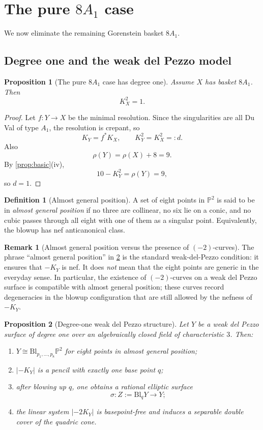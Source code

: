 \documentclass[11pt]{article}
\newtheorem{proposition}[proposition]{Proposition}
\theoremstyle{definition}
\newtheorem{remark}[remark]{Remark}
\newtheorem{definition}[definition]{Definition}
\newcommand{\Pbb}{\mathbb P}
\newcommand{\Bl}{\mathrm{Bl}}
\begin{document}
\section{The pure $8A_1$ case}\label{sec:pure8a1}
We now eliminate the remaining Gorenstein basket $8A_1$.

\subsection{Degree one and the weak del Pezzo model}

\begin{proposition}[The pure $8A_1$ case has degree one]\label{prop:8a1-degree-one}
Assume $X$ has basket $8A_1$. Then
\[
K_X^2=1.
\]
\end{proposition}

\begin{proof}
Let $f\colon Y\to X$ be the minimal resolution. Since the singularities are all Du Val of type $A_1$, the resolution is crepant, so
\[
K_Y=f^*K_X,
\qquad
K_Y^2=K_X^2=:d.
\]
Also
\[
\rho(Y)=\rho(X)+8=9.
\]
By \cref{prop:basic}(iv),
\[
10-K_Y^2=\rho(Y)=9,
\]
so $d=1$.
\end{proof}

\begin{definition}[Almost general position]
A set of eight points in $\Pbb^2$ is said to be in \emph{almost general position} if no three are collinear, no six lie on a conic, and no cubic passes through all eight with one of them as a singular point. Equivalently, the blowup has nef anticanonical class.
\end{definition}

\begin{remark}[Almost general position versus the presence of $(-2)$-curves]
The phrase ``almost general position'' in \cref{prop:deg1-weak-dp} is the standard weak-del-Pezzo condition: it ensures that $-K_Y$ is nef. It does \emph{not} mean that the eight points are generic in the everyday sense. In particular, the existence of $(-2)$-curves on a weak del Pezzo surface is compatible with almost general position; these curves record degeneracies in the blowup configuration that are still allowed by the nefness of $-K_Y$.
\end{remark}

\begin{proposition}[Degree-one weak del Pezzo structure]\label{prop:deg1-weak-dp}
Let $Y$ be a weak del Pezzo surface of degree one over an algebraically closed field of characteristic $3$. Then:
\begin{enumerate}[label=\textup{(\roman*)}]
\item $Y\cong \Bl_{p_1,\dots,p_8}\Pbb^2$ for eight points in almost general position;
\item $|-K_Y|$ is a pencil with exactly one base point $q$;
\item after blowing up $q$, one obtains a rational elliptic surface
\[
\sigma\colon Z:=\Bl_qY\to Y;
\]
\item the linear system $|-2K_Y|$ is basepoint-free and induces a separable double cover of the quadric cone.
\end{enumerate}
\end{proposition}
\end{document}
